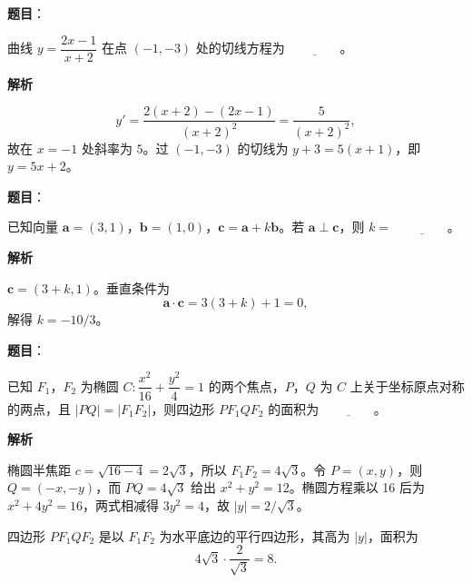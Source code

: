\begin{answer}

\textbf{题目}：

曲线 $y=\dfrac{2x-1}{x+2}$ 在点 $(-1,-3)$ 处的切线方程为 $\underline{\qquad\qquad}$。

\textbf{解析}

\nopagebreak[4]
\[
y'=\frac{2(x+2)-(2x-1)}{(x+2)^2}=\frac5{(x+2)^2},
\]
故在 $x=-1$ 处斜率为 $5$。过 $(-1,-3)$ 的切线为 $y+3=5(x+1)$，即 $y=5x+2$。


\end{answer}
\begin{answer}

\textbf{题目}：

已知向量 $\boldsymbol a=(3,1)$，$\boldsymbol b=(1,0)$，$\boldsymbol c=\boldsymbol a+k\boldsymbol b$。若 $\boldsymbol a\perp\boldsymbol c$，则 $k=$ $\underline{\qquad\qquad}$。

\textbf{解析}

$\boldsymbol c=(3+k,1)$。垂直条件为
\nopagebreak[4]
\[
\boldsymbol a\cdot\boldsymbol c=3(3+k)+1=0,
\]
解得 $k=-10/3$。


\end{answer}
\begin{answer}

\textbf{题目}：

已知 $F_1$，$F_2$ 为椭圆 $C:\dfrac{x^2}{16}+\dfrac{y^2}{4}=1$ 的两个焦点，$P$，$Q$ 为 $C$ 上关于坐标原点对称的两点，且 $|PQ|=|F_1F_2|$，则四边形 $PF_1QF_2$ 的面积为 $\underline{\qquad\qquad}$。

\textbf{解析}

椭圆半焦距 $c=\sqrt{16-4}=2\sqrt3$，所以 $F_1F_2=4\sqrt3$。令 $P=(x,y)$，则 $Q=(-x,-y)$，而 $PQ=4\sqrt3$ 给出 $x^2+y^2=12$。椭圆方程乘以 16 后为 $x^2+4y^2=16$，两式相减得 $3y^2=4$，故 $|y|=2/\sqrt3$。

四边形 $PF_1QF_2$ 是以 $F_1F_2$ 为水平底边的平行四边形，其高为 $|y|$，面积为
\nopagebreak[4]
\[
4\sqrt3\cdot\frac2{\sqrt3}=8.
\]


\end{answer}

